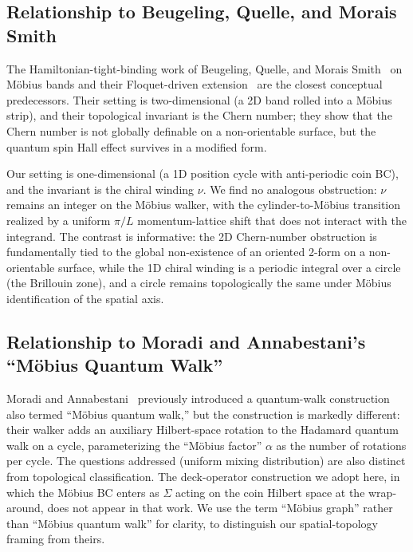\documentclass[aps,pra,reprint,amsmath,amssymb,superscriptaddress,nofootinbib,longbibliography]{revtex4-2}
\begin{document}
\subsection{Relationship to Beugeling, Quelle, and Morais Smith}

The Hamiltonian-tight-binding work of Beugeling, Quelle, and Morais Smith~\cite{beugeling2014} on M\"obius bands and their Floquet-driven extension~\cite{quelle2014} are the closest conceptual predecessors. Their setting is two-dimensional (a 2D band rolled into a M\"obius strip), and their topological invariant is the Chern number; they show that the Chern number is not globally definable on a non-orientable surface, but the quantum spin Hall effect survives in a modified form.

Our setting is one-dimensional (a 1D position cycle with anti-periodic coin BC), and the invariant is the chiral winding $\nu$. We find no analogous obstruction: $\nu$ remains an integer on the M\"obius walker, with the cylinder-to-M\"obius transition realized by a uniform $\pi/L$ momentum-lattice shift that does not interact with the integrand. The contrast is informative: the 2D Chern-number obstruction is fundamentally tied to the global non-existence of an oriented 2-form on a non-orientable surface, while the 1D chiral winding is a periodic integral over a circle (the Brillouin zone), and a circle remains topologically the same under M\"obius identification of the spatial axis.

\subsection{Relationship to Moradi and Annabestani's ``M\"obius Quantum Walk''}

Moradi and Annabestani~\cite{moradi2017} previously introduced a quantum-walk construction also termed ``M\"obius quantum walk,'' but the construction is markedly different: their walker adds an auxiliary Hilbert-space rotation to the Hadamard quantum walk on a cycle, parameterizing the ``M\"obius factor'' $\alpha$ as the number of rotations per cycle. The questions addressed (uniform mixing distribution) are also distinct from topological classification. The deck-operator construction we adopt here, in which the M\"obius BC enters as $\Sigma$ acting on the coin Hilbert space at the wrap-around, does not appear in that work. We use the term ``M\"obius graph'' rather than ``M\"obius quantum walk'' for clarity, to distinguish our spatial-topology framing from theirs.
\end{document}
